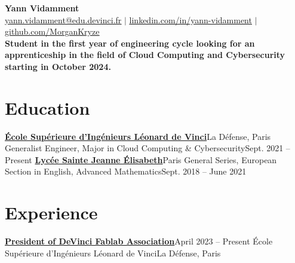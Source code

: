 \documentclass[letterpaper,11pt]{article}
\begin{document}
\begin{center}
  \textbf{\Huge Yann Vidamment} \\ \vspace{1pt}
  \href{mailto:yann.vidamment@edu.devinci.fr}{\underline{yann.vidamment@edu.devinci.fr}} $|$ 
  \href{https://linkedin.com/in/yann-vidamment-80a512254/}{\underline{linkedin.com/in/yann-vidamment}} $|$
  \href{https://github.com/MorganKryze}{\underline{github.com/MorganKryze}}\\
  \vspace{6pt}
  \textbf{\small{Student in the first year of engineering cycle looking for an apprenticeship in the field of Cloud Computing and Cybersecurity starting in October 2024.}}
\end{center}

\section{Education}
  \resumeSubHeadingListStart
    \resumeSubheading
      {\href{https://www.esilv.fr/}{\textbf{École Supérieure d'Ingénieurs Léonard de Vinci}}}{La Défense, Paris}
      {Generalist Engineer, Major in Cloud Computing \& Cybersecurity}{Sept. 2021 -- Present}
    \resumeSubheading
      {\href{https://www.ste-jeanne-elisabeth.com/}{\textbf{Lycée Sainte Jeanne Élisabeth}}}{Paris}
      {General Series, European Section in English, Advanced Mathematics}{Sept. 2018 -- June 2021}
  \resumeSubHeadingListEnd

\section{Experience}
  \resumeSubHeadingListStart
    \resumeSubheading
      {\href{https://dvic.devinci.fr/fablab/}{\textbf{President of DeVinci Fablab Association}}}{April 2023 -- Present}
      {École Supérieure d'Ingénieurs Léonard de Vinci}{La Défense, Paris}
      \resumeItemListStart
      \resumeItemListEnd
\end{document}
